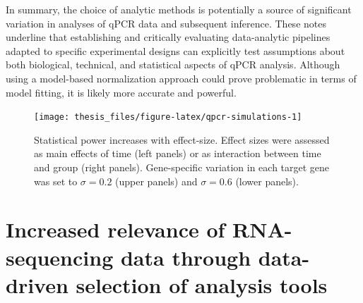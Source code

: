 \documentclass[twoside,10pt]{gihclass} %
\begin{document}
In summary, the choice of analytic methods is potentially a source of significant variation in analyses of qPCR data and subsequent inference.
These notes underline that establishing and critically evaluating data-analytic pipelines adapted to specific experimental designs can explicitly test assumptions about both biological, technical, and statistical aspects of qPCR analysis.
Although using a model-based normalization approach could prove problematic in terms of model fitting, it is likely more accurate and powerful.
\begin{figure}

{\centering \texttt{[image: thesis\_files/figure-latex/qpcr-simulations-1]} 

}

\caption[qPCR power-simulation]{Statistical power increases with effect-size. Effect sizes were assessed as main effects of time (left panels) or as interaction between time and group (right panels). Gene-specific variation in each target gene was set to $\sigma=0.2$ (upper panels) and $\sigma=0.6$ (lower panels).}\label{fig:qpcr-simulations}
\end{figure}
\hypertarget{increased-relevance-of-rna-sequencing-data-through-data-driven-selection-of-analysis-tools}{%
\section{Increased relevance of RNA-sequencing data through data-driven selection of analysis tools}\label{increased-relevance-of-rna-sequencing-data-through-data-driven-selection-of-analysis-tools}}
\end{document}
